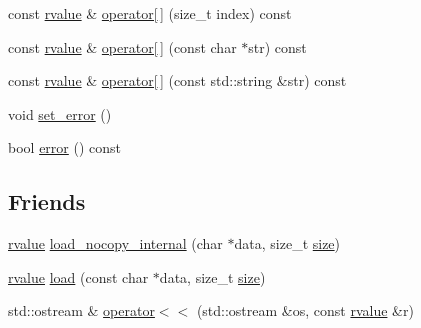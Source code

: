\begin{DoxyCompactItemize}
const \hyperlink{classcrow_1_1json_1_1rvalue}{rvalue} \& \hyperlink{classcrow_1_1json_1_1rvalue_a6f52f58283cd61b1b711d3f4f72c631b}{operator\mbox{[}$\,$\mbox{]}} (size\-\_\-t index) const 
\item 
const \hyperlink{classcrow_1_1json_1_1rvalue}{rvalue} \& \hyperlink{classcrow_1_1json_1_1rvalue_aed99db517e62fe9b13388c75084c851f}{operator\mbox{[}$\,$\mbox{]}} (const char $\ast$str) const 
\item 
const \hyperlink{classcrow_1_1json_1_1rvalue}{rvalue} \& \hyperlink{classcrow_1_1json_1_1rvalue_a245f0e757ce21f314670c2feb7f45340}{operator\mbox{[}$\,$\mbox{]}} (const std\-::string \&str) const 
\item 
void \hyperlink{classcrow_1_1json_1_1rvalue_a83856d0ddcd6e7236c49b26158ff56a0}{set\-\_\-error} ()
\item 
bool \hyperlink{classcrow_1_1json_1_1rvalue_af762bba6443f9d111297148b3cc3de55}{error} () const 
\end{DoxyCompactItemize}
\subsection*{Friends}
\begin{DoxyCompactItemize}
\item 
\hyperlink{classcrow_1_1json_1_1rvalue}{rvalue} \hyperlink{classcrow_1_1json_1_1rvalue_ae5a3f52c3dd924c56c934a35d584077b}{load\-\_\-nocopy\-\_\-internal} (char $\ast$data, size\-\_\-t \hyperlink{classcrow_1_1json_1_1rvalue_ae81a5701e24fe2c1bf349d307bc486d2}{size})
\item 
\hyperlink{classcrow_1_1json_1_1rvalue}{rvalue} \hyperlink{classcrow_1_1json_1_1rvalue_a10b60dd760c49dbb7c904e850b298eb5}{load} (const char $\ast$data, size\-\_\-t \hyperlink{classcrow_1_1json_1_1rvalue_ae81a5701e24fe2c1bf349d307bc486d2}{size})
\item 
std\-::ostream \& \hyperlink{classcrow_1_1json_1_1rvalue_a59b7d051c0f407eec8c8bba224d205ff}{operator$<$$<$} (std\-::ostream \&os, const \hyperlink{classcrow_1_1json_1_1rvalue}{rvalue} \&r)
\end{DoxyCompactItemize}


